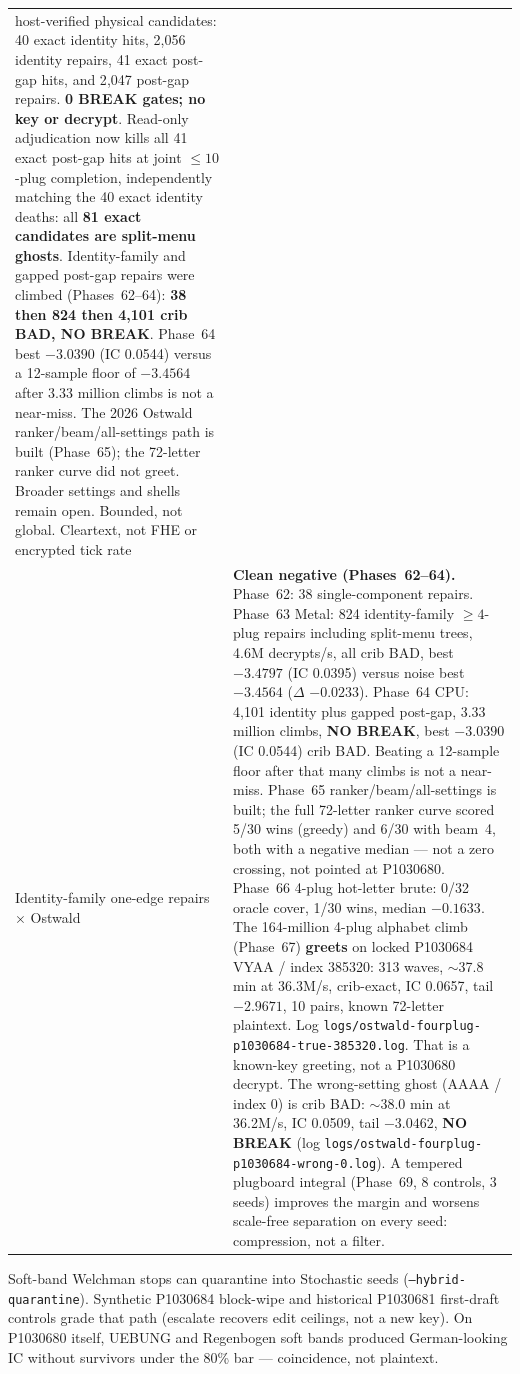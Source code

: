 \documentclass[11pt,a4paper]{article}
\begin{document}
{\begin{longtable}{@{}p{}p{}@{}}
  host-verified physical candidates: 40 exact identity hits, 2{,}056 identity
  repairs, 41 exact post-gap hits, and 2{,}047 post-gap repairs. \textbf{0 BREAK
  gates; no key or decrypt}. Read-only adjudication now kills all 41 exact post-gap
  hits at joint $\le10$-plug completion, independently matching the 40 exact identity
  deaths: all \textbf{81 exact candidates are split-menu ghosts}. Identity-family
  and gapped post-gap repairs were climbed (Phases~62--64):
  \textbf{38 then 824 then 4{,}101 crib BAD, NO BREAK}. Phase~64 best $-3.0390$
  (IC 0.0544) versus a 12-sample floor of $-3.4564$ after 3.33 million climbs is
  not a near-miss. The 2026 Ostwald ranker/beam/all-settings path is built
  (Phase~65); the 72-letter ranker curve did not greet. Broader settings
  and shells remain open. Bounded, not global.
  Cleartext, not FHE or encrypted tick rate \\
Identity-family one-edge repairs $\times$ Ostwald &
  \textbf{Clean negative (Phases~62--64).} Phase~62: 38 single-component repairs.
  Phase~63 Metal: 824 identity-family $\ge4$-plug repairs including split-menu trees,
  4.6M decrypts/s, all crib BAD, best $-3.4797$ (IC 0.0395) versus
  noise best $-3.4564$ ($\Delta$ $-0.0233$). Phase~64 CPU: 4{,}101 identity plus
  gapped post-gap, 3.33 million climbs, \textbf{NO BREAK}, best $-3.0390$
  (IC 0.0544) crib BAD. Beating a 12-sample floor after that many climbs is not a
  near-miss. Phase~65 ranker/beam/all-settings is built; the full 72-letter
  ranker curve scored 5/30 wins (greedy) and 6/30 with beam~4, both with a
  negative median --- not a zero crossing, not pointed at P1030680. Phase~66
  4-plug hot-letter brute: 0/32 oracle cover, 1/30 wins, median $-0.1633$.
  The 164-million 4-plug alphabet climb (Phase~67) \textbf{greets} on
  locked P1030684 VYAA / index 385320: 313 waves, $\sim$37.8 min at 36.3M/s,
  crib-exact, IC 0.0657, tail $-2.9671$, 10 pairs, known 72-letter plaintext.
  Log \texttt{logs/ostwald-fourplug-p1030684-true-385320.log}.
  That is a known-key greeting, not a P1030680 decrypt. The wrong-setting
  ghost (AAAA / index 0) is crib BAD: $\sim$38.0 min at 36.2M/s, IC 0.0509,
  tail $-3.0462$, \textbf{NO BREAK}
  (log \texttt{logs/ostwald-fourplug-p1030684-wrong-0.log}).
  A tempered plugboard integral (Phase~69, 8 controls, 3 seeds) improves the
  margin and worsens scale-free separation on every seed: compression, not a filter. \\
\bottomrule
\end{longtable}
}

Soft-band Welchman stops can quarantine into Stochastic seeds
(\texttt{--hybrid-quarantine}).
Synthetic P1030684 block-wipe and historical P1030681 first-draft controls
grade that path (escalate recovers edit ceilings, not a new key).
On P1030680 itself, UEBUNG and Regenbogen soft bands produced German-looking
IC without survivors under the 80\% bar --- coincidence, not plaintext.
\end{document}
